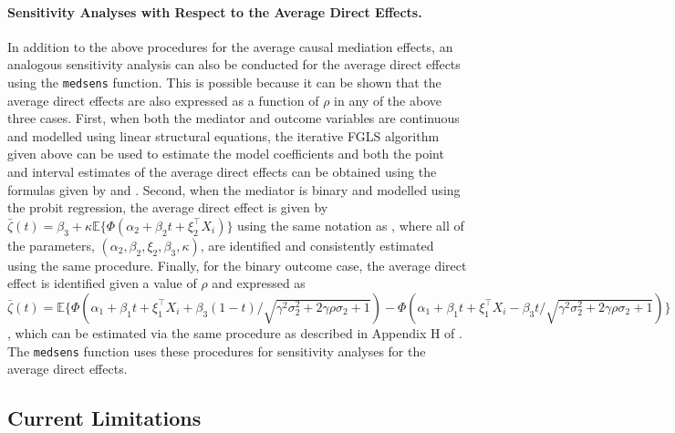 \documentclass[11pt,letterpaper]{article}
\theoremstyle{plain}
\newcommand\E{\mathbb{E}}
\begin{document}
\paragraph{Sensitivity Analyses with Respect to the Average Direct Effects.}
In addition to the above procedures for the average causal mediation effects,
an analogous sensitivity analysis can also be conducted for the average direct
effects using the {\tt medsens} function.  This is possible because it can be
shown that the average direct effects are also expressed as a function of $\rho$
in any of the above three cases.  First, when both the mediator and outcome variables
are continuous and modelled using linear structural equations, the iterative FGLS algorithm
given above can be used to estimate the model coefficients and both the point and interval
estimates of the average direct effects can be obtained using the formulas given by
\citet[Section 4.1]{imai:keel:yama:10} and \citet[p.314 and Appendix A]{imai:keel:ting:10}.
Second, when the mediator is binary and modelled using the probit regression,
the average direct effect is given by $\bar\zeta(t) = \beta_3 + \kappa\E\{
\Phi(\alpha_2 + \beta_2 t + \xi_2^\top X_i)\}$ using the same notation as
\citet[footnote 12]{imai:keel:ting:10}, where all of the parameters, $(\alpha_2,
\beta_2, \xi_2, \beta_3, \kappa)$, are identified and consistently estimated
using the same procedure.  Finally, for the binary outcome case,
the average direct effect is identified given a value of $\rho$ and expressed
as $\bar\zeta(t) = \E\{\Phi(\alpha_1 + \beta_1 t + \xi_1^\top X_i +
\beta_3(1-t)/\sqrt{\gamma^2\sigma_2^2 + 2\gamma\rho\sigma_2 + 1})
- \Phi(\alpha_1 + \beta_1 t + \xi_1^\top X_i - \beta_3 t/\sqrt{\gamma^2\sigma_2^2 + 2\gamma\rho\sigma_2 + 1}) \}$, which can be estimated via the same procedure as
described in Appendix H of \citet{imai:keel:ting:10}.  The {\tt medsens} function
uses these procedures for sensitivity analyses for the average direct effects.

\subsection{Current Limitations}
\end{document}
